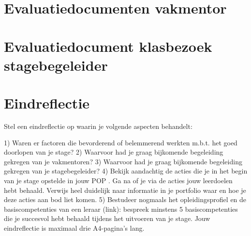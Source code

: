 \documentclass[a4paper,12pt,twoside]{article}%
\begin{document}
	
	\section{Evaluatiedocumenten vakmentor}
	
	
	
	
	
	
	
	
	
	
	

	
	
	
	\section{Evaluatiedocument klasbezoek stagebegeleider}
	
	\section{Eindreflectie}
	Stel een eindreflectie op waarin je volgende aspecten behandelt: 
	
	1) Waren er factoren die bevorderend of belemmerend werkten m.b.t. het goed doorlopen van je stage? 
	2) Waarvoor had je graag bijkomende begeleiding gekregen van je vakmentoren? 
	3) Waarvoor had je graag bijkomende begeleiding gekregen van je stagebegeleider? 
	4) Bekijk aandachtig de acties die je in het begin van je stage opstelde in jouw POP . Ga na of je via de acties jouw leerdoelen hebt behaald. Verwijs heel duidelijk naar informatie in je portfolio waar en hoe je deze acties aan bod liet komen. 
	5)  Bestudeer nogmaals het opleidingsprofiel en de basiscompetenties van een leraar (link):  bespreek minstens 5 basiscompetenties die je succesvol hebt behaald tijdens het uitvoeren van je stage. 
	Jouw eindreflectie is maximaal drie A4-pagina’s lang. 
	
\end{document}

